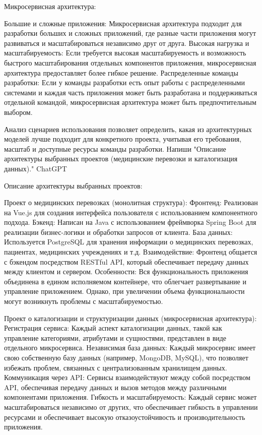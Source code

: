 Микросервисная архитектура:

    Большие и сложные приложения: Микросервисная архитектура подходит для разработки больших и сложных приложений, где разные части приложения могут развиваться и масштабироваться независимо друг от друга.
    Высокая нагрузка и масштабируемость: Если требуется высокая масштабируемость и возможность быстрого масштабирования отдельных компонентов приложения, микросервисная архитектура предоставляет более гибкое решение.
    Распределенные команды разработки: Если у команды разработки есть опыт работы с распределенными системами и каждая часть приложения может быть разработана и поддерживаться отдельной командой, микросервисная архитектура может быть предпочтительным выбором.

Анализ сценариев использования позволяет определить, какая из архитектурных моделей лучше подходит для конкретного проекта, учитывая его требования, масштаб и доступные ресурсы команды разработки.
Напиши "Описание архитектуры выбранных проектов (медицинские перевозки и каталогизация данных)."
ChatGPT




Описание архитектуры выбранных проектов:

    Проект о медицинских перевозках (монолитная структура):
        Фронтенд: Реализован на Vue.js для создания интерфейса пользователя с использованием компонентного подхода.
        Бэкенд: Написан на Java с использованием фреймворка Spring Boot для реализации бизнес-логики и обработки запросов от клиента.
        База данных: Используется PostgreSQL для хранения информации о медицинских перевозках, пациентах, медицинских учреждениях и т.д.
        Взаимодействие: Фронтенд общается с бэкендом посредством RESTful API, который обеспечивает передачу данных между клиентом и сервером.
        Особенности: Вся функциональность приложения объединена в едином исполняемом контейнере, что облегчает развертывание и управление приложением. Однако, при увеличении объема функциональности могут возникнуть проблемы с масштабируемостью.

    Проект о каталогизации и структуризации данных (микросервисная архитектура):
        Регистрация сервиса: Каждый аспект каталогизации данных, такой как управление категориями, атрибутами и сущностями, представлен в виде отдельного микросервиса.
        Независимая база данных: Каждый микросервис имеет свою собственную базу данных (например, MongoDB, MySQL), что позволяет избежать проблем, связанных с централизованным хранилищем данных.
        Коммуникация через API: Сервисы взаимодействуют между собой посредством API, обеспечивая передачу данных и вызов методов между различными компонентами приложения.
        Гибкость и масштабируемость: Каждый сервис может масштабироваться независимо от других, что обеспечивает гибкость в управлении ресурсами и обеспечивает высокую отказоустойчивость и производительность приложения.

